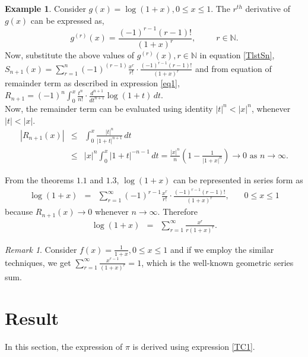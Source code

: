 \documentclass{amsart}
\theoremstyle{definition}
\newtheorem{example}[theorem]{Example}
\theoremstyle{remark}
\newtheorem{remark}[theorem]{Remark}
\numberwithin{equation}{section}
\begin{document}
\begin{example}
Consider $g(x)=\log (1+x),0\leq x \leq 1$. The $r^{th}$ derivative of $g(x)$ can be expressed as,
\begin{equation*}
  g^{(r)}(x)=\frac{(-1)^{r-1}(r-1)!}{(1+x)^r},~~~~~~~~~~~ r\in \mathbb{N}.
\end{equation*}
Now, substitute the above values of $g^{(r)}(x), r\in \mathbb{N}$ in equation \eqref{TlstSn},\\
$\displaystyle{ S_{n+1}(x)=\sum_{r=1}^n (-1)^{(r-1)} \frac{x^r}{r!} \cdot \frac{(-1)^{r-1}(r-1)!}{(1+x)^r} }$
 and from equation of remainder term as described in expression \eqref{eq1},
$\displaystyle{R_{n+1}=(-1)^n \int_0^x \frac{t^n}{n!} \cdot \frac{d^{n+1}}{dt^{n+1}}  \log (1+t)\,dt }$.\\
Now, the remainder term can be evaluated using identity $|t|^n < |x|^n$, whenever $|t|<|x|$.
\begin{eqnarray*}
|R_{n+1}(x)| &\leq & \int_0^x \frac{|t|^n}{|1+t|^{n+1}}\,dt\\
&\leq & |x|^n \int_0^x |1+t|^{-n-1} \,dt = \frac{|x|^n}{n} \left( 1- \frac{1}{|1+x|^n} \right) \rightarrow 0 \textrm { as } n \rightarrow \infty.
\end{eqnarray*}

\noindent From the theorems $1.1$ and $1.3$, $\log (1+x)$ can be represented in series form as
\begin{eqnarray*}
\log (1+x) &=& \sum_{r=1}^\infty (-1)^{r-1} \frac{x^r}{r!} \cdot \frac{(-1)^{r-1}(r-1)!}{(1+x)^r} ,~~~~~~~~0\leq x \leq 1
\end{eqnarray*}
because $R_{n+1}(x) \rightarrow 0$ whenever $n \rightarrow \infty$. Therefore
\begin{eqnarray*}
\log (1+x) &=& \sum_{r=1}^\infty \frac{x^r}{r(1+x)^r}.
\end{eqnarray*}

\end{example}

\begin{remark}
Consider $\displaystyle{f(x) = \frac{1}{1+x}, 0\leq x \leq1 }$ and if we employ the similar techniques, we get $\displaystyle{ \sum_{r=1}^\infty \frac{x^{r-1}}{(1+x)^r}=1}$, which is the well-known geometric series sum.
\end{remark}


\section{Result}
In this section, the expression of $\pi$ is derived using expression \eqref{TC1}.
\end{document}
